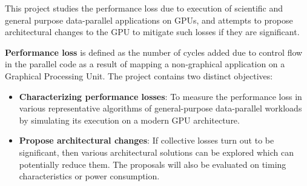 
\par{
This project studies the performance loss due to execution of scientific and general purpose data-parallel applications on GPUs, and attempts to propose architectural changes to the GPU to mitigate such losses if they are significant.}

\par{\textbf{Performance loss} is defined as the number of cycles added due to control flow in the parallel code as a result of mapping a non-graphical application on a Graphical Processing Unit. The project contains two distinct objectives:}

\begin{itemize}
\item \textbf{Characterizing performance losses}: To measure the performance loss in various representative algorithms of general-purpose data-parallel workloads by simulating its execution on a modern GPU architecture.  
\item \textbf{Propose architectural changes}: If collective losses turn out to be significant, then various architectural solutions can be explored which can potentially reduce them. The proposals will also be evaluated on timing characteristics or power consumption.
\end{itemize}
